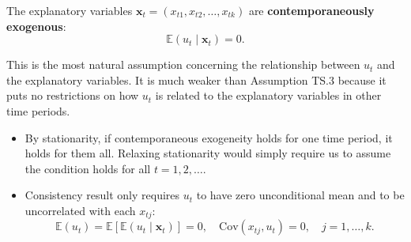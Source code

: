 \documentclass[a4paper, 10pt]{article}
\theoremstyle{definition}	%
\begin{document}
\vspace{0.5cm}

\begin{tcolorbox}[colback=blue!5!white, colframe=blue!80!black, title=Assumption TS.3' -- Zero Conditional Mean]
The explanatory variables \( \mathbf{x}_t = (x_{t1}, x_{t2}, \ldots, x_{tk}) \) are \textbf{contemporaneously exogenous}: 
\[
\mathbb{E}(u_t \mid \mathbf{x}_t) = 0.
\]
\end{tcolorbox}
This is the most natural assumption concerning the relationship between \( u_t \) and the explanatory variables. It is much weaker than Assumption TS.3 because it puts no restrictions on how \( u_t \) is related to the explanatory variables in other time periods.
\begin{itemize}
    \item By stationarity, if contemporaneous exogeneity holds for one time period, it holds for them all. Relaxing stationarity would simply require us to assume the condition holds for all \( t = 1, 2, \dots \).
    \item Consistency result only requires \( u_t \) to have zero unconditional mean and to be uncorrelated with each \( x_{tj} \):
    \begin{equation}
    \mathbb{E}(u_t) = \mathbb{E}[\mathbb{E}(u_t \mid \mathbf{x}_t)] = 0, \quad \text{Cov}(x_{tj}, u_t) = 0, \quad j = 1, \ldots, k.
    \label{eq:6}
\end{equation}
\end{itemize}
\end{document}

